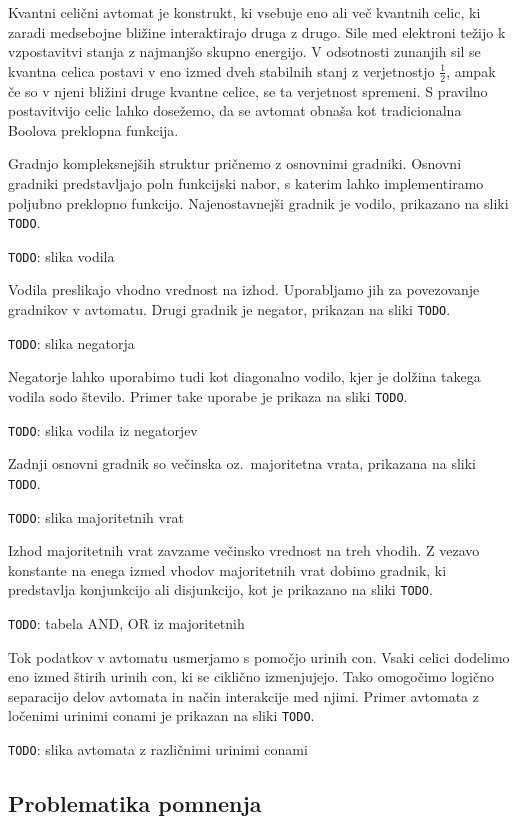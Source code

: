 \documentclass[a4paper, 11pt]{article}
\newcommand{\todo}{\textcolor{BrickRed}{\texttt{TODO}}} %
\begin{document}
Kvantni celični avtomat je konstrukt, ki vsebuje eno ali več kvantnih celic, ki zaradi medsebojne bližine interaktirajo druga z drugo.
Sile med elektroni težijo k vzpostavitvi stanja z najmanjšo skupno energijo.
V odsotnosti zunanjih sil se kvantna celica postavi v eno izmed dveh stabilnih stanj z verjetnostjo $\frac{1}{2}$, ampak če so v njeni bližini druge kvantne celice, se ta verjetnost spremeni.
S pravilno postavitvijo celic lahko dosežemo, da se avtomat obnaša kot tradicionalna Boolova preklopna funkcija.

Gradnjo kompleksnejših struktur pričnemo z osnovnimi gradniki.
Osnovni gradniki predstavljajo poln funkcijski nabor, s katerim lahko implementiramo poljubno preklopno funkcijo.
Najenostavnejši gradnik je vodilo, prikazano na sliki \todo.

\todo: slika vodila

Vodila preslikajo vhodno vrednost na izhod.
Uporabljamo jih za povezovanje gradnikov v avtomatu.
Drugi gradnik je negator, prikazan na sliki \todo.

\todo: slika negatorja

Negatorje lahko uporabimo tudi kot diagonalno vodilo, kjer je dolžina takega vodila sodo število.
Primer take uporabe je prikaza na sliki \todo.

\todo: slika vodila iz negatorjev

Zadnji osnovni gradnik so večinska oz.~majoritetna vrata, prikazana na sliki \todo.

\todo: slika majoritetnih vrat

Izhod majoritetnih vrat zavzame večinsko vrednost na treh vhodih.
Z vezavo konstante na enega izmed vhodov majoritetnih vrat dobimo gradnik, ki predstavlja konjunkcijo ali disjunkcijo, kot je prikazano na sliki \todo.

\todo: tabela AND, OR iz majoritetnih

Tok podatkov v avtomatu usmerjamo s pomočjo urinih con.
Vsaki celici dodelimo eno izmed štirih urinih con, ki se ciklično izmenjujejo.
Tako omogočimo logično separacijo delov avtomata in način interakcije med njimi.
Primer avtomata z ločenimi urinimi conami je prikazan na sliki \todo.

\todo: slika avtomata z različnimi urinimi conami

\subsection{Problematika pomnenja}
\end{document}
